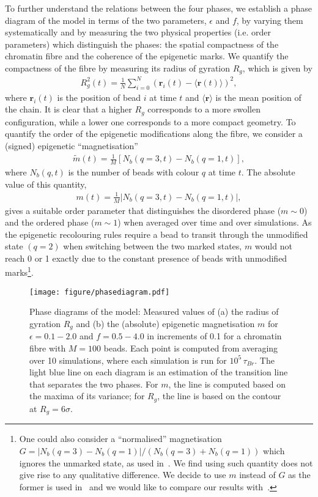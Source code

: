 \documentclass[12pt]{article}
\newcommand*{\DataFig}{/Users/MichaelChiang/Desktop/epigenetics_data/}
\newcommand{\abs}[1]{\left|#1\right|}
\begin{document}
To further understand the relations between the four phases, we establish a phase diagram of the model in terms of the two parameters, $\epsilon$ and  $f$, by varying them systematically and by measuring the two physical properties (i.e. order parameters) which distinguish the phases: the spatial compactness of the chromatin fibre and the coherence of the epigenetic marks. We quantify the compactness of the fibre by measuring its radius of gyration $R_g$, which is given by
\begin{eqnarray}
R^2_g(t) = \frac{1}{N}\sum_{i = 0}^{N} \left(\bm{r}_{i}(t) - \langle \bm{r}(t) \rangle\right)^2,
\end{eqnarray}
\FloatBarrier
where $\bm{r}_i(t)$ is the position of bead $i$ at time $t$ and $\langle\bm{r}\rangle$ is the mean position of the chain. It is clear that a higher $R_g$ corresponds to a more swollen configuration, while a lower one corresponds to a more compact geometry. To quantify the order of the epigenetic modifications along the fibre, we consider a (signed) epigenetic ``magnetisation''
\begin{eqnarray}
\widetilde{m}(t) = \frac{1}{M}\left[N_b(q = 3, t) - N_b(q = 1, t)\right],
\end{eqnarray}
where $N_b(q,t)$ is the number of beads with colour $q$ at time $t$. The absolute value of this quantity,
\begin{eqnarray}
m(t) = \frac{1}{M}\abs{N_b(q = 3, t) - N_b(q = 1, t)},
\end{eqnarray}
gives a suitable order parameter that distinguishes the disordered phase ($m \sim 0$) and the ordered phase ($m \sim 1$) when averaged over time and over simulations. As the epigenetic recolouring rules require a bead to transit through the unmodified state $(q = 2)$ when switching between the two marked states, $m$ would not reach 0 or 1 exactly due to the constant presence of beads with unmodified marks\footnote{One could also consider a ``normalised'' magnetisation $G = \abs{N_b(q = 3) - N_b(q = 1)}/(N_b(q=3)+N_b(q=1))$ which ignores the unmarked state, as used in~\cite{dodd2007}. We find using such quantity does not give rise to any qualitative difference. We decide to use $m$ instead of $G$ as the former is used in~\cite{michieletto2016} and we would like to compare our results with~\cite{michieletto2016}.}.  
\begin{figure}[h]
\centering
\texttt{[image: figure/phasediagram.pdf]}
\caption{Phase diagrams of the model: Measured values of (a) the radius of gyration $R_g$ and (b) the (absolute) epigenetic magnetisation $m$ for $\epsilon = 0.1 - 2.0$ and $f = 0.5 - 4.0$ in increments of 0.1 for a chromatin fibre with $M = 100$ beads. Each point is computed from averaging over 10 simulations, where each simulation is run for $10^5\,\tau_{Br}$. The light blue line on each diagram is an estimation of the transition line that separates the two phases. For $m$, the line is computed based on the maxima of its variance; for $R_g$, the line is based on the contour at $R_g = 6\sigma$.}
\label{fig:phasediagram}
\end{figure}
\end{document}

